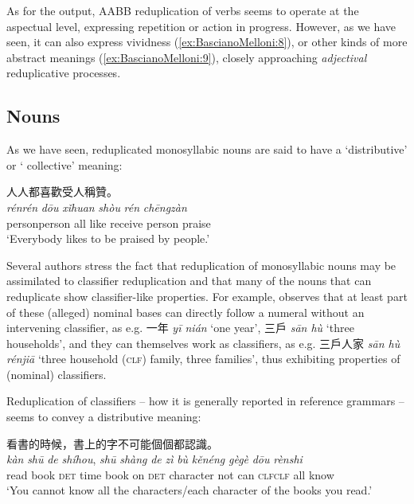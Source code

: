 \documentclass[output=paper]{langsci/langscibook}
\begin{document}
As for the output, AABB reduplication of verbs seems to operate at the
aspectual level, expressing repetition or action in progress. However,
as we have seen, it can also express vividness (\ref{ex:BascianoMelloni:8}), or other kinds of
more abstract meanings (\ref{ex:BascianoMelloni:9}), closely approaching \emph{adjectival}
reduplicative processes.
\subsection{Nouns}

As we have seen, reduplicated monosyllabic nouns are said to have a
`distributive' or ` collective' meaning:

\ea\label{ex:BascianoMelloni:19} 人人都喜歡受人稱贊。\\
\gll \emph{rén\tld{}rén} \emph{dōu} \emph{xǐhuan} \emph{shòu} \emph{rén} \emph{chēngzàn}\\
person\emph{\tld{}}person all like receive person praise\\
\glt `Everybody likes to be praised by people.'
\z

Several authors %
\citep[e.g.][]{Hu95,Cai07,Li09} %
%
stress the fact that
reduplication of monosyllabic nouns may be assimilated to classifier
reduplication and that many of the nouns that can reduplicate show
classifier-like properties. For example, %
\citet[103]{Hu95} %
%
observes that at
least part of these (alleged) nominal bases can directly follow a
numeral without an intervening classifier, as e.g. 一年 \emph{yī nián}
`one year', 三戶 \emph{sān hù} `three households', and they can
themselves work as classifiers, as e.g. 三戶人家 \emph{sān hù rénjiā}
`three household (\textsc{clf}) family, three families', thus exhibiting
properties of (nominal) classifiers.

Reduplication of classifiers -- how it is generally reported in
reference grammars -- seems to convey a distributive meaning:

\ea\label{ex:BascianoMelloni:20}看書的時候，書上的字不可能個個都認識。\\
\gll \emph{kàn} \emph{shū} \emph{de} \emph{shíhou}, \emph{shū} \emph{shàng} \emph{de} \emph{zì} \emph{bù} \emph{kěnéng} \emph{gè\tld{}gè} \emph{dōu} \emph{rènshi}\\
read book \textsc{det} time book on \textsc{det} character not can \textsc{clf}\emph{\tld{}}\textsc{clf} all know\\
\glt `You cannot know all the characters/each character of the books you
read.'\\
\z
\end{document}
